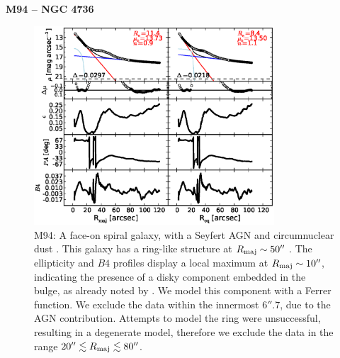 \documentclass[preprint2]{emulateapj}
\newcommand{\fitfigurewidth}{0.8\textwidth}
\begin{document}
  \clearpage\newpage\noindent
  {\bf M94 -- NGC 4736 \\}

  \begin{figure}[h]
  \begin{center}
  \includegraphics[width=\fitfigurewidth]{m94_1Dfit.eps}
  \caption{M94: 
  A face-on spiral galaxy, with a Seyfert AGN \citep{veroncettyveron2006} and 
  circumnuclear dust \citep{elmegreen2002m94,peeplesmartini2006m94}.
  This galaxy has a ring-like structure at $R_{\rm maj} \sim 50''$ \citep{munoztunon1989m94}.
  The ellipticity and $B4$ profiles display a local maximum at $R_{\rm maj} \sim 10''$, 
  indicating the presence of a disky component embedded in the bulge,
  as already noted by \cite{fisherdrory2010}.
  We model this component with a Ferrer function.
  We exclude the data within the innermost $6''.7$, due to the AGN contribution.
  Attempts to model the ring were unsuccessful, resulting in a degenerate model, 
  therefore we exclude the data in the range $20'' \lesssim R_{\rm maj} \lesssim 80''$.
  }
  \end{center}
  \end{figure}
\end{document}
